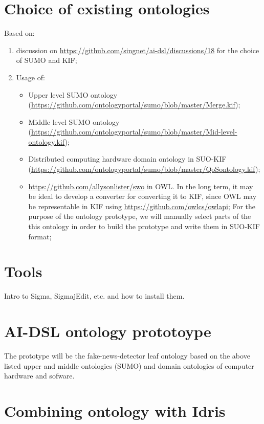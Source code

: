 \documentclass[]{report}
\begin{document}
\section{Choice of existing ontologies}

Based on:
\begin{enumerate}
	\item discussion on \href{reusing existing ontologies}{https://github.com/singnet/ai-dsl/discussions/18} for the choice of SUMO and KIF;
	\item Usage of:
	\begin{itemize}
		\item Upper level SUMO ontology (\href{Merge.kif}{https://github.com/ontologyportal/sumo/blob/master/Merge.kif});
		\item Middle level SUMO ontology (\href{Mid-level-ontology.kif}{https://github.com/ontologyportal/sumo/blob/master/Mid-level-ontology.kif});
		\item Distributed computing hardware domain ontology in SUO-KIF (\href{QoSontology.kif}{https://github.com/ontologyportal/sumo/blob/master/QoSontology.kif});
		\item \href{Software ontology}{https://github.com/allysonlister/swo} in OWL. In the long term, it may be ideal to develop a converter for converting it to KIF, since OWL may be representable in KIF \cite{martin_translations_nodate} using \href{OWL API}{https://github.com/owlcs/owlapi}; For the purpose of the ontology prototype, we will manually select parts of the this ontology in order to build the prototype and write them in SUO-KIF format;
	\end{itemize}
\end{enumerate}

\section{Tools}

Intro to Sigma, SigmajEdit, etc. and how to install them.

\section{AI-DSL ontology prototoype}

The prototype will be the fake-news-detector leaf ontology based on the above listed upper and middle ontologies (SUMO) and domain ontologies of computer hardware and sofware.

\section{Combining ontology with Idris}
\end{document}
